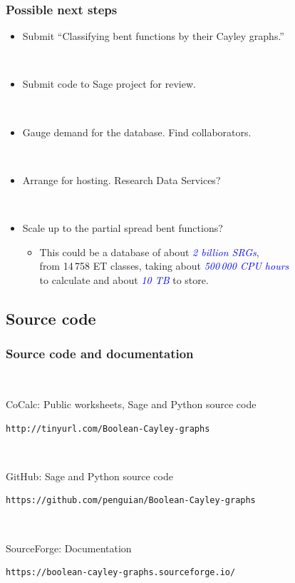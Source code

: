 \documentclass[pdf,sprung,slideColor,nocolorBG]{beamer}
\newenvironment{colortheme}[1]{
\def\ProvidesPackageRCS $##1${\relax}
\renewcommand{\ProcessOptions}{\relax}
\makeatletter

\makeatother
}{}
\newcommand{\Emph}[1]{\emph{\textcolor{blue}{#1}}}
\begin{document}
\begin{colortheme}{jubata}

\begin{frame}[fragile]
\frametitle{Possible next steps}

\begin{itemize}
 \item
Submit ``Classifying bent functions by their Cayley graphs.''

~

 \item
Submit code to Sage project for review.

~

 \item
Gauge demand for the database. Find collaborators.

~

 \item
Arrange for hosting. Research Data Services?

~

 \item
Scale up to the partial spread bent functions?

 \begin{itemize}
  \item
This could be a database of about \Emph{2 billion SRGs},
\\
from 14\,758 ET classes, taking about \Emph{500\,000 CPU hours}
\\
to calculate and about \Emph{10 TB} to store.
 \end{itemize}
\end{itemize}
\end{frame}

\end{colortheme}

\subsection{Source code}

\begin{colortheme}{jubata}

\begin{frame}[fragile]
\frametitle{Source code and documentation}
~

CoCalc: Public worksheets, Sage and Python source code

\begin{verbatim}
http://tinyurl.com/Boolean-Cayley-graphs
\end{verbatim}

~

GitHub: Sage and Python source code

\begin{verbatim}
https://github.com/penguian/Boolean-Cayley-graphs
\end{verbatim}

~

SourceForge: Documentation

\begin{verbatim}
https://boolean-cayley-graphs.sourceforge.io/
\end{verbatim}
\end{frame}

\end{colortheme}
\end{document}

